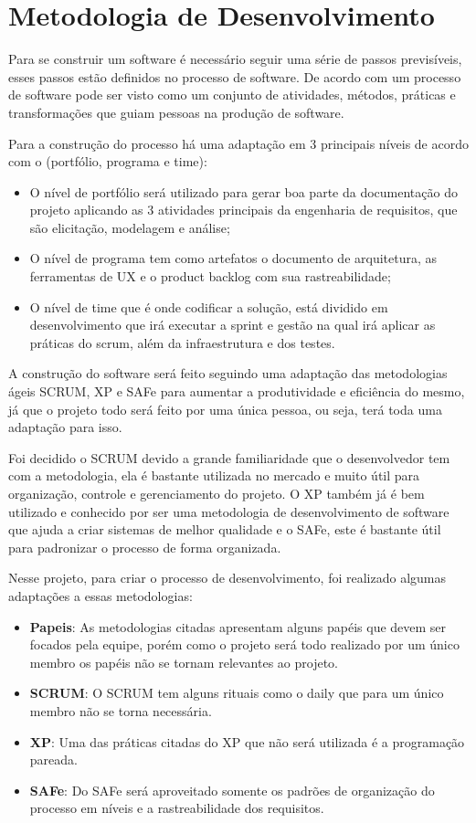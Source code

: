 \section{Metodologia de Desenvolvimento}

Para se construir um software é necessário seguir uma série de passos previsíveis, esses passos estão definidos no processo de software. De acordo com \cite{pressman} um processo de software pode ser visto como um conjunto de atividades, métodos, práticas e transformações que guiam pessoas na produção de software.

Para a construção do processo há uma adaptação em 3 principais níveis de acordo com o \cite{safe} (portfólio, programa e time):

\begin{itemize}
  \item O nível de portfólio será utilizado para gerar boa parte da documentação do projeto aplicando as 3 atividades principais da engenharia de requisitos, que são elicitação, modelagem e análise;
  \item O nível de programa tem como artefatos o documento de arquitetura, as ferramentas de UX e o product backlog com sua rastreabilidade;
  \item O nível de time que é onde codificar a solução, está dividido em desenvolvimento que irá executar a sprint e gestão na qual irá aplicar as práticas do scrum, além da infraestrutura e dos testes.
\end{itemize}

A construção do software será feito seguindo uma adaptação das metodologias ágeis SCRUM, XP e SAFe para aumentar a produtividade e eficiência do mesmo, já que o projeto todo será feito por uma única pessoa, ou seja, terá toda uma adaptação para isso.

Foi decidido o SCRUM devido a grande familiaridade que o desenvolvedor tem com a metodologia, ela é bastante utilizada no mercado e muito útil para organização, controle e gerenciamento do projeto. O XP também já é bem utilizado e conhecido por ser uma metodologia de desenvolvimento de software que ajuda a criar sistemas de melhor qualidade e o SAFe, este é bastante útil para padronizar o processo de forma organizada.

Nesse projeto, para criar o processo de desenvolvimento, foi realizado algumas adaptações a essas metodologias:

\begin{itemize}
  \item \textbf{Papeis}: As metodologias citadas apresentam alguns papéis que devem ser focados pela equipe, porém como o projeto será todo realizado por um único membro os papéis não se tornam relevantes ao projeto.
  \item \textbf{SCRUM}: O SCRUM tem alguns rituais como o daily que para um único membro não se torna necessária.
  \item \textbf{XP}: Uma das práticas citadas do XP que não será utilizada é a programação pareada.
  \item \textbf{SAFe}: Do SAFe será aproveitado somente os padrões de organização do processo em níveis e a rastreabilidade dos requisitos.
\end{itemize}

